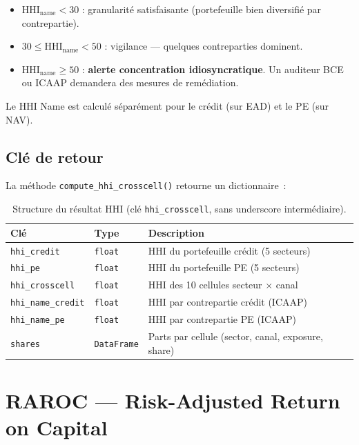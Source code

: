 \documentclass[12pt,a4paper]{article}
\begin{document}
\begin{interpretbox}
\begin{itemize}[nosep]
    \item $\text{HHI}_{\text{name}} < 30$ : granularit\'e satisfaisante (portefeuille bien diversifi\'e par contrepartie).
    \item $30 \leq \text{HHI}_{\text{name}} < 50$ : vigilance --- quelques contreparties dominent.
    \item $\text{HHI}_{\text{name}} \geq 50$ : \textbf{alerte concentration idiosyncratique}. Un auditeur BCE ou ICAAP demandera des mesures de rem\'ediation.
\end{itemize}
Le HHI Name est calcul\'e s\'epar\'ement pour le cr\'edit (sur EAD) et le PE (sur NAV).
\end{interpretbox}

\subsection{Cl\'e de retour}

La m\'ethode \texttt{compute\_hhi\_crosscell()} retourne un dictionnaire~:

\begin{table}[h]
\centering
\begin{tabular}{llp{7cm}}
\toprule
\textbf{Cl\'e} & \textbf{Type} & \textbf{Description} \\
\midrule
\texttt{hhi\_credit} & \texttt{float} & HHI du portefeuille cr\'edit (5 secteurs) \\
\texttt{hhi\_pe} & \texttt{float} & HHI du portefeuille PE (5 secteurs) \\
\texttt{hhi\_crosscell} & \texttt{float} & HHI des 10 cellules secteur $\times$ canal \\
\texttt{hhi\_name\_credit} & \texttt{float} & HHI par contrepartie cr\'edit (ICAAP) \\
\texttt{hhi\_name\_pe} & \texttt{float} & HHI par contrepartie PE (ICAAP) \\
\texttt{shares} & \texttt{DataFrame} & Parts par cellule (sector, canal, exposure, share) \\
\bottomrule
\end{tabular}
\caption{Structure du r\'esultat HHI (cl\'e \texttt{hhi\_crosscell}, sans underscore interm\'ediaire).}
\label{tab:hhi_return}
\end{table}

\section{RAROC --- Risk-Adjusted Return on Capital}
\label{sec:raroc}
\end{document}
